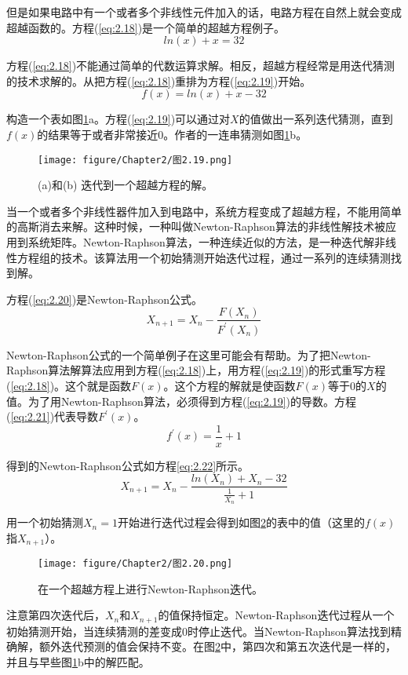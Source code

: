但是如果电路中有一个或者多个非线性元件加入的话，电路方程在自然上就会变成超越函数的。方程(\ref{eq:2.18})是一个简单的超越方程例子。
\begin{equation}
    ln(x)+x = 32
    \label{eq:2.18}
\end{equation}

方程(\ref{eq:2.18})不能通过简单的代数运算求解。相反，超越方程经常是用迭代猜测的技术求解的。从把方程(\ref{eq:2.18})重排为方程(\ref{eq:2.19})开始。
\begin{equation}
    f(x) = ln(x)+x-32
    \label{eq:2.19}
\end{equation}

构造一个表如图\ref{图2.19}a。方程(\ref{eq:2.19})可以通过对$X$的值做出一系列迭代猜测，直到$f(x)$的结果等于或者非常接近0。作者的一连串猜测如图\ref{图2.19}b。
\begin{figure}[htbp]
\small
    \centering
    \texttt{[image: figure/Chapter2/图2.19.png]}
    \caption{(a)和(b) 迭代到一个超越方程的解。}
    \label{图2.19}
\end{figure}

当一个或者多个非线性器件加入到电路中，系统方程变成了超越方程，不能用简单的高斯消去来解。这种时候，一种叫做Newton-Raphson算法的非线性解技术被应用到系统矩阵。Newton-Raphson算法，一种连续近似的方法，是一种迭代解非线性方程组的技术。该算法用一个初始猜测开始迭代过程，通过一系列的连续猜测找到解。

方程(\ref{eq:2.20})是Newton-Raphson公式。
\begin{equation}
    X_{n+1}=X_n - \frac{F(X_n)}{F^{'}(X_n)}
    \label{eq:2.20}
\end{equation}

Newton-Raphson公式的一个简单例子在这里可能会有帮助。为了把Newton-Raphson算法解算法应用到方程(\ref{eq:2.18})上，用方程(\ref{eq:2.19})的形式重写方程(\ref{eq:2.18})。这个就是函数$F(x)$。这个方程的解就是使函数$F(x)$等于0的$X$的值。为了用Newton-Raphson算法，必须得到方程(\ref{eq:2.19})的导数。方程(\ref{eq:2.21})代表导数$F^{'}(x)$。
\begin{equation}
    f^{'}(x) = \frac{1}{x}+1
    \label{eq:2.21}
\end{equation}

得到的Newton-Raphson公式如方程\ref{eq:2.22}所示。
\begin{equation}
    X_{n+1}=X_{n}-\frac{ln(X_n)+X_n-32}{\frac{1}{X_n}+1}
    \label{eq:2.22}
\end{equation}

用一个初始猜测$X_n=1$开始进行迭代过程会得到如图\ref{图2.20}的表中的值（这里的$f(x)$指$X_{n+1}$）。
\begin{figure}[htbp]
\small
    \centering
    \texttt{[image: figure/Chapter2/图2.20.png]}
    \caption{在一个超越方程上进行Newton-Raphson迭代。}
    \label{图2.20}
\end{figure}
注意第四次迭代后，$X_n$和$X_{n+1}$的值保持恒定。Newton-Raphson迭代过程从一个初始猜测开始，当连续猜测的差变成0时停止迭代。当Newton-Raphson算法找到精确解，额外迭代预测的值会保持不变。在图\ref{图2.20}中，第四次和第五次迭代是一样的，并且与早些图\ref{图2.19}b中的解匹配。

